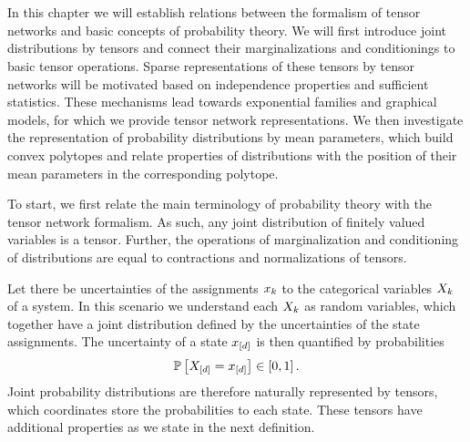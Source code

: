 \chapter{\chatextprobRepresentation}\label{cha:probRepresentation}

In this chapter we will establish relations between the formalism of tensor networks and basic concepts of probability theory.
We will first introduce joint distributions by tensors and connect their marginalizations and conditionings to basic tensor operations.
Sparse representations of these tensors by tensor networks will be motivated based on independence properties and sufficient statistics.
These mechanisms lead towards exponential families and graphical models, for which we provide tensor network representations.
We then investigate the representation of probability distributions by mean parameters, which build convex polytopes and relate properties of distributions with the position of their mean parameters in the corresponding polytope.



To start, we first relate the main terminology of probability theory with the tensor network formalism.
As such, any joint distribution of finitely valued variables is a tensor.
Further, the operations of marginalization and conditioning of distributions are equal to contractions and normalizations of tensors.


Let there be uncertainties of the assignments $x_{k}$ to the categorical variables $X_{k}$ of a system.
In this scenario we understand each $X_{k}$ as random variables, which together have a joint distribution defined by the uncertainties of the state assignments.
The uncertainty of a state $x_{[d]}$ is then quantified by probabilities
\begin{align*}
    \mathbb{P}\left[X_{[d]}=x_{[d]}\right] \in [0,1] \, .
\end{align*}
Joint probability distributions are therefore naturally represented by tensors, which coordinates store the probabilities to each state.
These tensors have additional properties as we state in the next definition.

